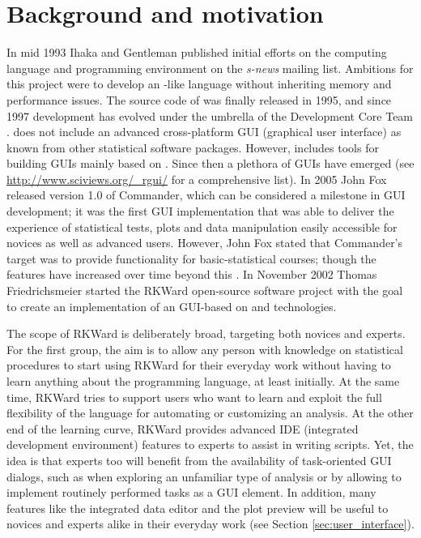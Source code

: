 \section{Background and motivation}
\label{background}
In mid 1993 Ihaka and Gentleman published initial efforts on the computing
language and programming environment  on the \emph{s-news} mailing list. Ambitions for
this project were to develop an -like language without inheriting memory
and performance issues. The source code of  was finally released in 1995, and 
since 1997 development has evolved under the umbrella of the  
Development Core Team \citep{RDCT2001, RDCT2010, Ihaka_Gentlemen_1993}.
 does not include an advanced cross-platform GUI (graphical user interface) as known from other
statistical software packages. However,  includes tools for building GUIs
mainly based on  \citep{Dalgaard2001, Dalgaard2002}. Since then a
plethora of  GUIs have emerged (see \url{http://www.sciviews.org/_rgui/} for a
comprehensive list). In 2005 John Fox released version 1.0 of  Commander, which
can be considered a milestone in  GUI development; it was the first GUI
implementation that was able to deliver the experience of statistical tests,
plots and data manipulation easily accessible for  novices as well as advanced
users. However, John Fox stated that  Commander's target was to provide
functionality for basic-statistical courses; though the features have increased over
time beyond this \citep{Fox2005, Fox2007}. In November 2002 Thomas Friedrichsmeier
started the RKWard open-source software project with the goal to create an
implementation of an  GUI-based on  and  technologies.

The scope of RKWard is deliberately broad, targeting both  novices and experts.
For the first group, the aim is to allow any person with knowledge on
statistical procedures to start using RKWard for their everyday work 
without having to learn anything about the  programming language,
at least initially. At the same time, RKWard tries to support users who want to learn and
exploit the full flexibility of the  language for automating or customizing
an analysis. At the other end of the learning curve, RKWard provides advanced IDE (integrated development environment)
features to  experts to assist in writing  scripts. Yet, the idea
is that  experts too will benefit from the availability of task-oriented GUI
dialogs, such as when exploring an unfamiliar type of analysis
or by allowing to implement routinely performed tasks as a GUI element. In
addition, many features like the integrated data editor and the plot preview 
will be useful to  novices and  experts alike in their everyday work
(see Section \ref{sec:user_interface}).

